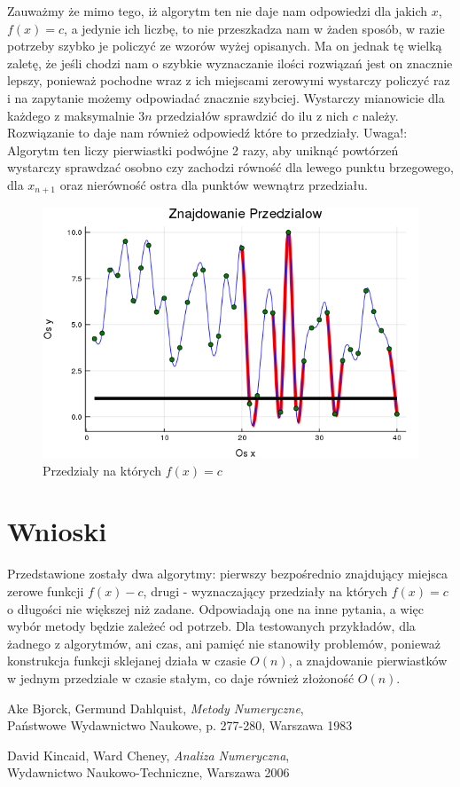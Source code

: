\documentclass[paper=a4, fontsize=11pt]{scrartcl} %
\numberwithin{equation}{section} %
\numberwithin{figure}{section} %
\numberwithin{table}{section} %
\begin{document}
Zauważmy że mimo tego, iż algorytm ten nie daje nam odpowiedzi dla jakich $x$, $f(x)=c$, a jedynie ich liczbę, to nie przeszkadza nam w żaden sposób, w razie potrzeby szybko je policzyć ze wzorów wyżej opisanych. Ma on jednak tę wielką zaletę, że jeśli chodzi nam o szybkie wyznaczanie ilości rozwiązań jest on znacznie lepszy, ponieważ pochodne wraz z ich miejscami zerowymi wystarczy policzyć raz i na zapytanie możemy odpowiadać znacznie szybciej. Wystarczy mianowicie dla każdego z maksymalnie $3n$ przedziałów sprawdzić do ilu z nich $c$ należy. Rozwiązanie to daje nam również odpowiedź które to przedziały.
\medbreak
\medbreak
\medbreak
Uwaga!: Algorytm ten liczy pierwiastki podwójne 2 razy, aby uniknąć powtórzeń wystarczy sprawdzać osobno czy zachodzi równość dla lewego punktu brzegowego, dla $x_{n+1}$ oraz nierówność ostra dla punktów wewnątrz przedziału.


\begin{figure}[h!]
 \includegraphics[width=0.95\linewidth]{przedzialy.png}
  \caption{Przedzialy na których $f(x) = c$}
  \label{przedzialy}
\end{figure}
\FloatBarrier


\section{Wnioski}
Przedstawione zostały dwa algorytmy: pierwszy bezpośrednio znajdujący miejsca zerowe funkcji $f(x) - c$, drugi - wyznaczający przedziały na których $f(x) = c$ o długości nie większej niż zadane. Odpowiadają one na inne pytania, a więc wybór metody będzie zależeć od potrzeb. Dla testowanych przykładów, dla żadnego z algorytmów, ani czas, ani pamięć nie stanowiły problemów, ponieważ konstrukcja funkcji sklejanej działa w czasie $O(n)$, a znajdowanie pierwiastków w jednym przedziale w czasie stałym, co daje również złożoność $O(n)$. 

\begin{thebibliography}{9}

  Ake Bjorck,
  Germund Dahlquist,
  \textit{Metody Numeryczne}, \\
  Państwowe Wydawnictwo Naukowe, p. 277-280,
  Warszawa 1983

  David Kincaid,
  Ward Cheney,
  \textit{Analiza Numeryczna}, \\
  Wydawnictwo Naukowo-Techniczne, 
  Warszawa 2006
\end{thebibliography}
\end{document}
